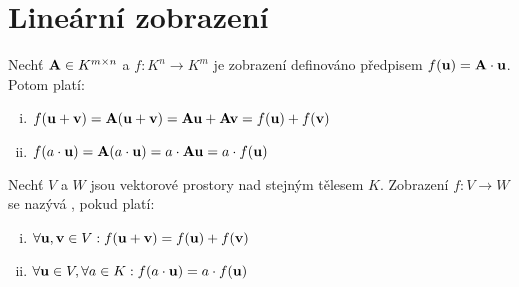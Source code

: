 \section{Lineární zobrazení}
\label{ch:linzobr}

\begin{observation}
    Nechť $\mathbf{A} \in K^{m \times n}$ a $f: K^n \rightarrow K^m$ je
    zobrazení definováno předpisem $f(\mathbf{u}) = \mathbf{A} \cdot \mathbf{u}$.
    Potom platí:
    \begin{enumerate}[i.]
        \item $f(\mathbf{u} + \mathbf{v}) = \mathbf{A}(\mathbf{u} + \mathbf{v}) = 
            \mathbf{A}\mathbf{u} + \mathbf{A}\mathbf{v} = f(\mathbf{u}) + f(\mathbf{v})$
        \item $f(a\cdot\mathbf{u}) = \mathbf{A}(a \cdot \mathbf{u}) = 
            a \cdot \mathbf{A}\mathbf{u} = a \cdot f(\mathbf{u})$
    \end{enumerate}
\end{observation}

\begin{definition}
    Nechť $V$ a $W$ jsou vektorové prostory nad stejným tělesem $K$.
    Zobrazení $f: V \rightarrow W$ se nazývá ,
    pokud platí:
    \begin{enumerate}[i.]
        \item $\forall \mathbf{u},\mathbf{v} \in V: f(\mathbf{u} + \mathbf{v}) = f(\mathbf{u}) 
            + f(\mathbf{v})$
        \item $\forall \mathbf{u} \in V, \forall a \in K: f(a\cdot\mathbf{u}) =
            a \cdot f(\mathbf{u})$
    \end{enumerate}
\end{definition}

